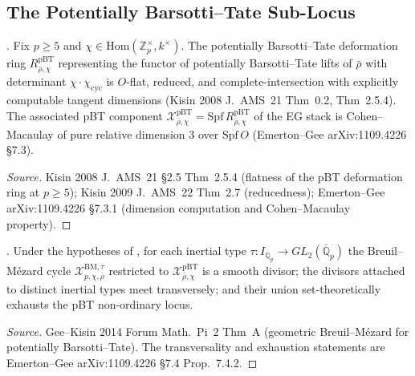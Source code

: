 \subsection{The Potentially Barsotti--Tate Sub-Locus}

\begin{lemma}
\label{v4-arith:w6-e:lem:Kisin-pBT}
\ClaimStatusProvedElsewhere. Fix \(p\geq 5\) and
\(\chi\in\mathrm{Hom}(\mathbb{Z}_{p}^{\times},k^{\times})\). The
potentially Barsotti--Tate deformation ring \(R^{\mathrm{pBT}}_{\bar\rho,\chi}\)
representing the functor of potentially Barsotti--Tate lifts of
\(\bar\rho\) with determinant \(\chi\cdot\chi_{\mathrm{cyc}}\) is
\(O\)-flat, reduced, and complete-intersection with explicitly
computable tangent dimensions (Kisin 2008 J.~AMS~21 Thm~0.2,
Thm~2.5.4). The associated pBT component
\(\mathcal{X}^{\mathrm{pBT}}_{\bar\rho,\chi}=\mathrm{Spf}\,R^{\mathrm{pBT}}_{\bar\rho,\chi}\)
of the EG stack is Cohen--Macaulay of pure relative dimension \(3\)
over \(\mathrm{Spf}\,O\) (Emerton--Gee arXiv:1109.4226 \S 7.3).
\end{lemma}

\begin{proof}[Source]
Kisin 2008 J.~AMS~21 \S 2.5 Thm~2.5.4 (flatness of the pBT
deformation ring at \(p\geq 5\)); Kisin 2009 J.~AMS~22 Thm~2.7
(reducedness); Emerton--Gee arXiv:1109.4226 \S 7.3.1 (dimension
computation and Cohen--Macaulay property).
\end{proof}

\begin{lemma}
\label{v4-arith:w6-e:lem:GK-BM-pBT}
\ClaimStatusProvedElsewhere. Under the hypotheses of
, for each inertial type
\(\tau\colon I_{\mathbb{Q}_{p}}\to GL_{2}(\overline{\mathbb{Q}}_{p})\)
the Breuil--M{\'e}zard cycle
\(\mathcal{X}^{\mathrm{BM},\tau}_{p,\chi,\bar\rho}\) restricted to
\(\mathcal{X}^{\mathrm{pBT}}_{\bar\rho,\chi}\) is a smooth divisor; the
divisors attached to distinct inertial types meet transversely; and
their union set-theoretically exhausts the pBT non-ordinary locus.
\end{lemma}

\begin{proof}[Source]
Gee--Kisin 2014 Forum Math.~Pi~2 Thm~A (geometric Breuil--M{\'e}zard
for potentially Barsotti--Tate). The transversality and exhaustion
statements are Emerton--Gee arXiv:1109.4226 \S 7.4 Prop.~7.4.2.
\end{proof}


